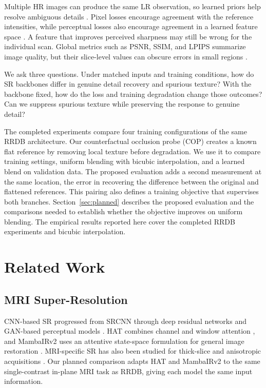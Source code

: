 \documentclass[journal]{IEEEtran}
\begin{document}
Multiple HR images can produce the same LR observation, so learned priors help resolve ambiguous details \cite{bhadra2021hallucinations}. Pixel losses encourage agreement with the reference intensities, while perceptual losses also encourage agreement in a learned feature space \cite{johnson2016perceptual}. A feature that improves perceived sharpness may still be wrong for the individual scan. Global metrics such as PSNR, SSIM, and LPIPS summarize image quality, but their slice-level values can obscure errors in small regions \cite{wang2004ssim,zhang2018lpips}.

We ask three questions. Under matched inputs and training conditions, how do SR backbones differ in genuine detail recovery and spurious texture? With the backbone fixed, how do the loss and training degradation change those outcomes? Can we suppress spurious texture while preserving the response to genuine detail?

The completed experiments compare four training configurations of the same RRDB architecture. Our counterfactual occlusion probe (COP) creates a known flat reference by removing local texture before degradation. We use it to compare training settings, uniform blending with bicubic interpolation, and a learned blend on validation data. The proposed evaluation adds a second measurement at the same location, the error in recovering the difference between the original and flattened references. This pairing also defines a training objective that supervises both branches. Section~\ref{sec:planned} describes the proposed evaluation and the comparisons needed to establish whether the objective improves on uniform blending. The empirical results reported here cover the completed RRDB experiments and bicubic interpolation.

\section{Related Work}
\subsection{MRI Super-Resolution}
CNN-based SR progressed from SRCNN \cite{dong2016srcnn} through deep residual networks \cite{lim2017edsr} and GAN-based perceptual models \cite{ledig2017srresnet,wang2018esrgan}. HAT combines channel and window attention \cite{chen2023hat}, and MambaIRv2 uses an attentive state-space formulation for general image restoration \cite{guo2025mambairv2}. MRI-specific SR has also been studied for thick-slice and anisotropic acquisitions \cite{chen2018mriSR,greenspan2009sr}. Our planned comparison adapts HAT and MambaIRv2 to the same single-contrast in-plane MRI task as RRDB, giving each model the same input information.
\end{document}
